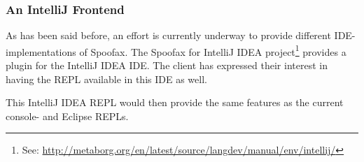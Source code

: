 \subsubsection{An IntelliJ Frontend}
\label{ssec:intellij}

As has been said before, an effort is currently underway to provide different
IDE-implementations of Spoofax. The Spoofax for IntelliJ IDEA
project\footnote{See:
\url{http://metaborg.org/en/latest/source/langdev/manual/env/intellij/}}
provides a plugin for the IntelliJ IDEA IDE. The client has expressed their
interest in having the REPL available in this IDE as well.

This IntelliJ IDEA REPL would then provide the same features as the current
console- and Eclipse REPLs.

